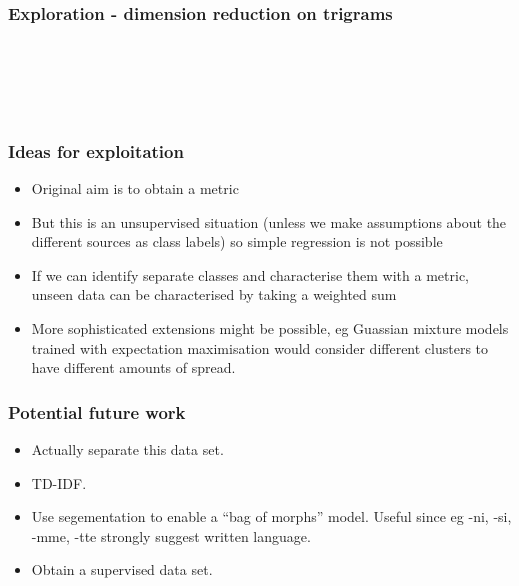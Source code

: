\documentclass{beamer}
\begin{document}
\begin{frame}
  \frametitle{Exploration - dimension reduction on trigrams}
  \begin{columns}[t]
      \centering
      \begin{figure}[H]
        \\
      \end{figure}
      \begin{figure}[H]
        
      \end{figure}
      \centering
      \begin{figure}[H]
        \\
      \end{figure}
      \begin{figure}[H]
        
      \end{figure}
  \end{columns}
\end{frame}

\begin{frame}
  \frametitle{Ideas for exploitation}
  \begin{itemize}
    \item Original aim is to obtain a metric

    \item But this is an unsupervised situation (unless we make assumptions
      about the different sources as class labels) so simple regression is not
      possible

    \item If we can identify separate classes and characterise them with a
      metric, unseen data can be characterised by taking a weighted sum

    \item More sophisticated extensions might be possible, eg Guassian mixture
      models trained with expectation maximisation would consider different
      clusters to have different amounts of spread.
  \end{itemize}
\end{frame}

\begin{frame}
  \frametitle{Potential future work}
  \begin{itemize}
    \item Actually separate this data set.

    \item TD-IDF.

    \item Use segementation to enable a ``bag of morphs'' model. Useful
      since eg -ni, -si, -mme, -tte strongly suggest written language.

    \item Obtain a supervised data set.
  \end{itemize}
\end{frame}
\end{document}
